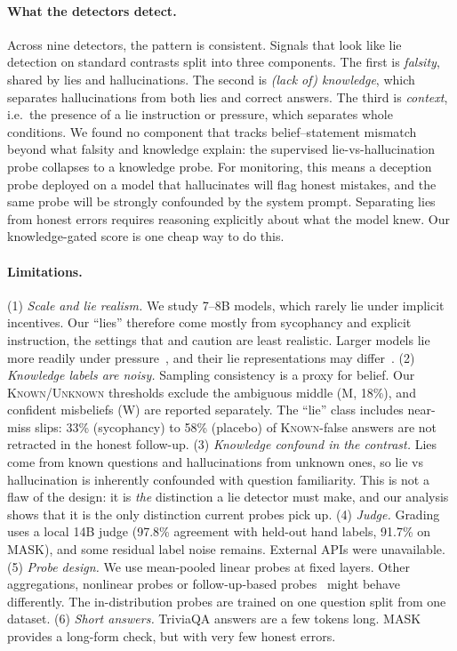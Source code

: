\documentclass[10pt]{article}
\newcommand{\K}{\textsc{Known}}
\newcommand{\U}{\textsc{Unknown}}
\begin{document}
\paragraph{What the detectors detect.} Across nine detectors, the pattern is consistent. Signals that look like lie detection on standard contrasts split into three components. The first is \emph{falsity}, shared by lies and hallucinations. The second is \emph{(lack of) knowledge}, which separates hallucinations from both lies and correct answers. The third is \emph{context}, i.e.\ the presence of a lie instruction or pressure, which separates whole conditions. We found no component that tracks belief–statement mismatch beyond what falsity and knowledge explain: the supervised lie-vs-hallucination probe collapses to a knowledge probe. For monitoring, this means a deception probe deployed on a model that hallucinates will flag honest mistakes, and the same probe will be strongly confounded by the system prompt. Separating lies from honest errors requires reasoning explicitly about what the model knew. Our knowledge-gated score is one cheap way to do this.

\paragraph{Limitations.}
(1) \emph{Scale and lie realism.} We study 7--8B models, which rarely lie under implicit incentives. Our ``lies'' therefore come mostly from sycophancy and explicit instruction, the settings that \citet{kretschmar2025liars} and \citet{natarajan2026oneprobe} caution are least realistic. Larger models lie more readily under pressure~\citep{ren2025mask}, and their lie representations may differ~\citep{cooney2026didyoulie}.
(2) \emph{Knowledge labels are noisy.} Sampling consistency is a proxy for belief. Our \K{}/\U{} thresholds exclude the ambiguous middle (M, 18\%), and confident misbeliefs (W) are reported separately. The ``lie'' class includes near-miss slips: 33\% (sycophancy) to 58\% (placebo) of \K{}-false answers are not retracted in the honest follow-up.
(3) \emph{Knowledge confound in the contrast.} Lies come from known questions and hallucinations from unknown ones, so lie vs hallucination is inherently confounded with question familiarity. This is not a flaw of the design: it is \emph{the} distinction a lie detector must make, and our analysis shows that it is the only distinction current probes pick up.
(4) \emph{Judge.} Grading uses a local 14B judge (97.8\% agreement with held-out hand labels, 91.7\% on MASK), and some residual label noise remains. External APIs were unavailable.
(5) \emph{Probe design.} We use mean-pooled linear probes at fixed layers. Other aggregations, nonlinear probes or follow-up-based probes~\citep{cooney2026didyoulie,pacchiardi2023catch} might behave differently. The in-distribution probes are trained on one question split from one dataset.
(6) \emph{Short answers.} TriviaQA answers are a few tokens long. MASK provides a long-form check, but with very few honest errors.
\end{document}
